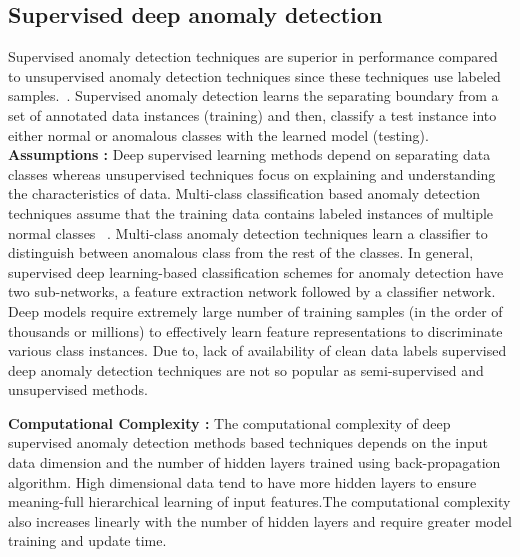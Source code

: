 \subsection{Supervised deep anomaly detection}
\label{sec:supervisedDAD}
 Supervised anomaly detection techniques are superior in performance compared to unsupervised anomaly detection techniques  since these techniques use  labeled samples.~\cite{gornitz2013toward}.  Supervised anomaly detection learns the separating boundary from a set of annotated data instances (training) and then, classify a test instance into  either normal or anomalous classes with the learned model (testing).\\
\textbf{Assumptions :}
Deep supervised learning methods depend on separating data classes whereas unsupervised
techniques focus on explaining and understanding the characteristics of data. Multi-class classification based anomaly detection techniques assume that the training data contains labeled instances of  multiple normal classes ~\cite{shilton2013combined,jumutc2014multi,kim2015deep,erfani2017shared}. Multi-class anomaly detection techniques learn a classifier to distinguish between anomalous class from the rest of the classes. In general, supervised deep learning-based classification schemes for anomaly detection have two sub-networks, a feature extraction network followed by a classifier network. Deep models require extremely large number of training samples (in the order of thousands or millions) to effectively learn feature representations to discriminate various class instances. Due to, lack of availability of clean data labels supervised deep anomaly detection techniques are not so popular as semi-supervised and unsupervised methods.

\textbf{Computational Complexity :} 
The computational complexity of deep supervised  anomaly detection methods based techniques depends on the  input data dimension and the number of hidden layers trained using back-propagation algorithm. High dimensional data tend to have more hidden layers to ensure meaning-full hierarchical learning of input features.The computational complexity also increases  linearly with the number of hidden layers and require greater model training and update time.


